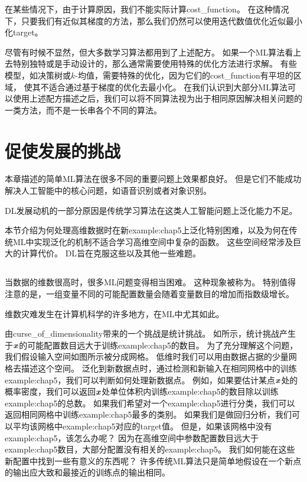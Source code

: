在某些情况下，由于计算原因，我们不能实际计算\gls{cost_function}。
在这种情况下，只要我们有近似其梯度的方法，那么我们仍然可以使用迭代数值优化近似最小化\gls{target}。

尽管有时候不显然，但大多数学习算法都用到了上述配方。
如果一个\gls{ML}算法看上去特别独特或是手动设计的，那么通常需要使用特殊的优化方法进行求解。
有些模型，如决策树或$k$-均值，需要特殊的优化，因为它们的\gls{cost_function}有平坦的区域，
使其不适合通过基于梯度的优化去最小化。
在我们认识到大部分\gls{ML}算法可以使用上述配方描述之后，我们可以将不同算法视为出于相同原因解决相关问题的一类方法，而不是一长串各个不同的算法。


\section{促使发展的挑战}
\label{sec:challenges_motivating_deep_learning}
本章描述的简单\gls{ML}算法在很多不同的重要问题上效果都良好。
但是它们不能成功解决人工智能中的核心问题，如语音识别或者对象识别。

\gls{DL}发展动机的一部分原因是传统学习算法在这类人工智能问题上泛化能力不足。

本节介绍为何处理高维数据时在新\gls{example:chap5}上泛化特别困难，以及为何在传统\gls{ML}中实现泛化的机制不适合学习高维空间中复杂的函数。
这些空间经常涉及巨大的计算代价。
\gls{DL}旨在克服这些以及其他一些难题。

\subsection{}
\label{sec:the_curse_of_dimensionality}
当数据的维数很高时，很多\gls{ML}问题变得相当困难。
这种现象被称为。
特别值得注意的是，一组变量不同的可能配置数量会随着变量数目的增加而指数级增长。

维数灾难发生在计算机科学的许多地方，在\gls{ML}中尤其如此。

由\gls{curse_of_dimensionality}带来的一个挑战是统计挑战。
如所示，统计挑战产生于$\boldsymbol{\mathit{x}}$的可能配置数目远大于训练\gls{example:chap5}的数目。
为了充分理解这个问题，我们假设输入空间如图所示被分成网格。
低维时我们可以用由数据占据的少量网格去描述这个空间。
泛化到新数据点时，通过检测和新输入在相同网格中的训练\gls{example:chap5}，我们可以判断如何处理新数据点。
例如，如果要估计某点$\boldsymbol{\mathit{x}}$处的概率密度，我们可以返回$\boldsymbol{\mathit{x}}$处单位体积内训练\gls{example:chap5}的数目除以训练\gls{example:chap5}的总数。
如果我们希望对一个\gls{example:chap5}进行分类，我们可以返回相同网格中训练\gls{example:chap5}最多的类别。
如果我们是做回归分析，我们可以平均该网格中\gls{example:chap5}对应的\gls{target}值。
但是，如果该网格中没有\gls{example:chap5}，该怎么办呢？  
因为在高维空间中参数配置数目远大于\gls{example:chap5}数目，大部分配置没有相关的\gls{example:chap5}。 %
我们如何能在这些新配置中找到一些有意义的东西呢？
许多传统\gls{ML}算法只是简单地假设在一个新点的输出应大致和最接近的训练点的输出相同。




